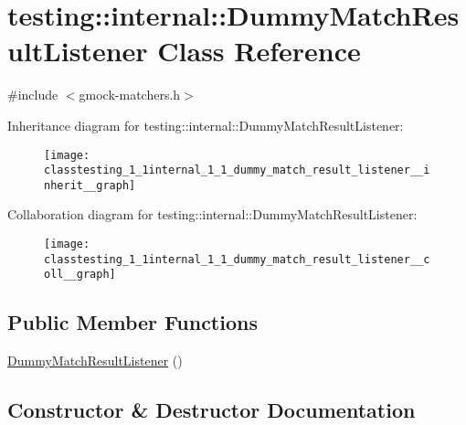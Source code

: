 \hypertarget{classtesting_1_1internal_1_1_dummy_match_result_listener}{}\section{testing\+:\+:internal\+:\+:Dummy\+Match\+Result\+Listener Class Reference}
\label{classtesting_1_1internal_1_1_dummy_match_result_listener}


{\ttfamily \#include $<$gmock-\/matchers.\+h$>$}



Inheritance diagram for testing\+:\+:internal\+:\+:Dummy\+Match\+Result\+Listener\+:
\nopagebreak
\begin{figure}[H]
\begin{center}
\leavevmode
\texttt{[image: classtesting\_1\_1internal\_1\_1\_dummy\_match\_result\_listener\_\_inherit\_\_graph]}
\end{center}
\end{figure}


Collaboration diagram for testing\+:\+:internal\+:\+:Dummy\+Match\+Result\+Listener\+:
\nopagebreak
\begin{figure}[H]
\begin{center}
\leavevmode
\texttt{[image: classtesting\_1\_1internal\_1\_1\_dummy\_match\_result\_listener\_\_coll\_\_graph]}
\end{center}
\end{figure}
\subsection*{Public Member Functions}
\begin{DoxyCompactItemize}
\item 
\hyperlink{classtesting_1_1internal_1_1_dummy_match_result_listener_a3284ab25167628be9a92e4ee5d2042fe}{Dummy\+Match\+Result\+Listener} ()
\end{DoxyCompactItemize}


\subsection{Constructor \& Destructor Documentation}
